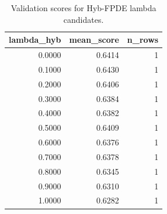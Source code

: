 \begin{table}[t]
\caption{Validation scores for Hyb-FPDE lambda candidates.}
\label{tab:lambda_distribution_computed}
\centering
\begin{tabular}{rrr}
\toprule
lambda\_hyb & mean\_score & n\_rows \\
\midrule
0.0000 & 0.6414 & 1 \\
0.1000 & 0.6430 & 1 \\
0.2000 & 0.6406 & 1 \\
0.3000 & 0.6384 & 1 \\
0.4000 & 0.6382 & 1 \\
0.5000 & 0.6409 & 1 \\
0.6000 & 0.6376 & 1 \\
0.7000 & 0.6378 & 1 \\
0.8000 & 0.6345 & 1 \\
0.9000 & 0.6310 & 1 \\
1.0000 & 0.6282 & 1 \\
\bottomrule
\end{tabular}

\end{table}
